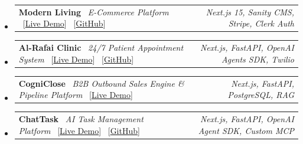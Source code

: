 \documentclass[11pt,letterpaper]{article}
\makeatletter
\newcommand{\headerrow}[2]
{\begin{tabular*}{\linewidth}{l@{\extracolsep{\fill}}r}
#1 &
#2 \\
\end{tabular*}}
\makeatother
\begin{document}
\begin{itemize}[leftmargin=1em]
	\parskip=0.15em

	\item
	      \headerrow
	      {\textbf{Modern Living} \textbar\ \emph{E-Commerce Platform} \ {\small [\href{https://ui-ux-hackhathone.vercel.app}{Live Demo}] \ [\href{https://github.com/HezziCode/ui-ux-hackhathone}{GitHub}]}}
	      {\emph{Next.js 15, Sanity CMS, Stripe, Clerk Auth}}

	\item
	      \headerrow
	      {\textbf{Al-Rafai Clinic} \textbar\ \emph{24/7 Patient Appointment System} \ {\small [\href{https://al-rafai-clinic.vercel.app}{Live Demo}] \ [\href{https://github.com/HezziCode/al-rafai-clinic-agent}{GitHub}]}}
	      {\emph{Next.js, FastAPI, OpenAI Agents SDK, Twilio}}

	\item
	      \headerrow
	      {\textbf{CogniClose} \textbar\ \emph{B2B Outbound Sales Engine \& Pipeline Platform} \ {\small [\href{https://cogniclose.com}{Live Demo}]}}
	      {\emph{Next.js, FastAPI, PostgreSQL, RAG}}

	\item
	      \headerrow
	      {\textbf{ChatTask} \textbar\ \emph{AI Task Management Platform} \ {\small [\href{https://secure-todoz.vercel.app/}{Live Demo}] \ [\href{https://github.com/HezziCode/spec-driven-devlopment-hackathone}{GitHub}]}}
	      {\emph{Next.js, FastAPI, OpenAI Agent SDK, Custom MCP}}


\end{itemize}
\end{document}
